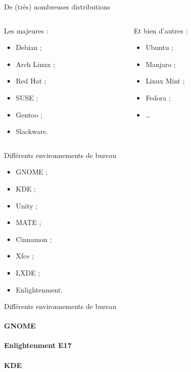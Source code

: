 \begin{frame}{De (très) nombreuses distributions}
  \begin{columns}
    \begin{column}[t]{.5\textwidth}
      Les majeures :
      \begin{itemize}
        \item Debian ;
        \item Arch Linux ;
        \item Red Hat ;
        \item SUSE ;
        \item Gentoo ;
        \item Slackware.
      \end{itemize}
    \end{column}
    \begin{column}[t]{.5\textwidth}
      Et bien d'autres :
      \begin{itemize}
        \item Ubuntu ;
        \item Manjaro ;
        \item Linux Mint ;
        \item Fedora ;
        \item \dots
      \end{itemize}
    \end{column}
  \end{columns}
\end{frame}

\begin{frame}{Différents environnements de bureau}
  \begin{multicols}{2}
    \begin{itemize}
      \item GNOME ;
      \item KDE ;
      \item Unity ;
      \item MATE ;
      \item Cinnamon ;
      \item Xfce ;
      \item LXDE ;
      \item Enlightenment.
    \end{itemize}
  \end{multicols}
\end{frame}

\begin{frame}{Différents environnements de bureau}
  \framesubtitle<1>{GNOME}
  \framesubtitle<2>{Enlightenment E17}
  \framesubtitle<3>{KDE}
      
\end{frame}

